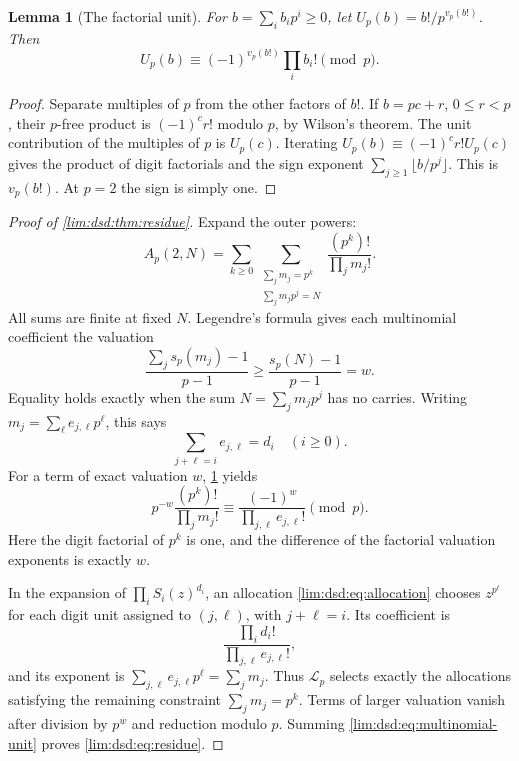 \documentclass[11pt]{article}
\newtheorem{lemma}[theorem]{Lemma}
\theoremstyle{definition}
\theoremstyle{remark}
\newcommand{\Lfun}{\mathcal L_p}
\begin{document}
\begin{lemma}[The factorial unit]
\label{lim:dsd:lem:unit-factorial}
For $b=\sum_i b_ip^i\ge0$, let $U_p(b)=b!/p^{v_p(b!)}$. Then
\begin{equation}
 U_p(b)\equiv(-1)^{v_p(b!)}\prod_i b_i!\pmod p.
 \label{lim:dsd:eq:unit-factorial}
\end{equation}
\end{lemma}
\begin{proof}
Separate multiples of $p$ from the other factors of $b!$. If
$b=pc+r$, $0\le r<p$, their $p$-free product is
$(-1)^c r!$ modulo $p$, by Wilson's theorem. The unit contribution
of the multiples of $p$ is $U_p(c)$. Iterating
$U_p(b)\equiv(-1)^c r!U_p(c)$ gives the product of digit factorials
and the sign exponent $\sum_{j\ge1}\lfloor b/p^j\rfloor$.
This is $v_p(b!)$. At $p=2$ the sign is simply one.
\end{proof}

\begin{proof}[Proof of \cref{lim:dsd:thm:residue}]
Expand the outer powers:
\begin{equation}
 A_p(2,N)=\sum_{k\ge0}
 \sum_{\substack{\sum_j m_j=p^k\\\sum_j m_jp^j=N}}
 \frac{(p^k)!}{\prod_j m_j!}.
 \label{lim:dsd:eq:multinomial-second}
\end{equation}
All sums are finite at fixed $N$. Legendre's formula gives each
multinomial coefficient the valuation
\begin{equation}
 \frac{\sum_j s_p(m_j)-1}{p-1}\ge
 \frac{s_p(N)-1}{p-1}=w.
 \label{lim:dsd:eq:multinomial-weight}
\end{equation}
Equality holds exactly when the sum $N=\sum_jm_jp^j$ has no carries.
Writing $m_j=\sum_\ell e_{j,\ell}p^\ell$, this says
\begin{equation}
 \sum_{j+\ell=i}e_{j,\ell}=d_i\quad(i\ge0).
 \label{lim:dsd:eq:allocation}
\end{equation}
For a term of exact valuation $w$, \cref{lim:dsd:lem:unit-factorial} yields
\begin{equation}
 p^{-w}\frac{(p^k)!}{\prod_jm_j!}
 \equiv\frac{(-1)^w}{\prod_{j,\ell}e_{j,\ell}!}\pmod p.
 \label{lim:dsd:eq:multinomial-unit}
\end{equation}
Here the digit factorial of $p^k$ is one, and the difference of
the factorial valuation exponents is exactly $w$.

In the expansion of $\prod_iS_i(z)^{d_i}$, an allocation
\eqref{lim:dsd:eq:allocation} chooses $z^{p^\ell}$ for each digit unit
assigned to $(j,\ell)$, with $j+\ell=i$. Its coefficient is
\[
 \frac{\prod_i d_i!}{\prod_{j,\ell}e_{j,\ell}!},
\]
and its exponent is $\sum_{j,\ell}e_{j,\ell}p^\ell=\sum_jm_j$.
Thus $\Lfun$ selects exactly the allocations satisfying the remaining
constraint $\sum_jm_j=p^k$. Terms of larger valuation vanish after
division by $p^w$ and reduction modulo $p$. Summing
\eqref{lim:dsd:eq:multinomial-unit} proves \eqref{lim:dsd:eq:residue}.
\end{proof}
\end{document}
